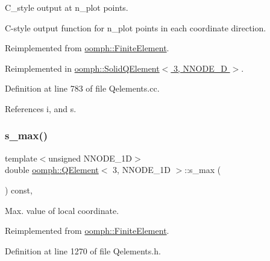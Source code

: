 C\+\_\+style output at n\+\_\+plot points. 

C-\/style output function for n\+\_\+plot points in each coordinate direction. 

Reimplemented from \hyperlink{classoomph_1_1FiniteElement_adfaee690bb0608f03320eeb9d110d48c}{oomph\+::\+Finite\+Element}.



Reimplemented in \hyperlink{classoomph_1_1SolidQElement_3_013_00_01NNODE__1D_01_4_a0de774d3e5a65e11b485d25f57e7f3a1}{oomph\+::\+Solid\+Q\+Element$<$ 3, N\+N\+O\+D\+E\+\_\+D $>$}.



Definition at line 783 of file Qelements.\+cc.



References i, and s.

\mbox{\label{classoomph_1_1QElement_3_013_00_01NNODE__1D_01_4_a2f387d9b2b15f85511b4347cd3d20533}} 
\subsubsection{\texorpdfstring{s\+\_\+max()}{s\_max()}}
{\footnotesize\ttfamily template$<$unsigned N\+N\+O\+D\+E\+\_\+1D$>$ \\
double \hyperlink{classoomph_1_1QElement}{oomph\+::\+Q\+Element}$<$ 3, N\+N\+O\+D\+E\+\_\+1D $>$\+::s\+\_\+max (\begin{DoxyParamCaption}{ }\end{DoxyParamCaption}) const\hspace{0.3cm}{\ttfamily [inline]}, {\ttfamily [virtual]}}



Max. value of local coordinate. 



Reimplemented from \hyperlink{classoomph_1_1FiniteElement_a64adbe9356927133686ab53f00341ea8}{oomph\+::\+Finite\+Element}.



Definition at line 1270 of file Qelements.\+h.

\mbox{\label{classoomph_1_1QElement_3_013_00_01NNODE__1D_01_4_a485dca6ed38c5c9653c5dcce3213ec2a}} 
